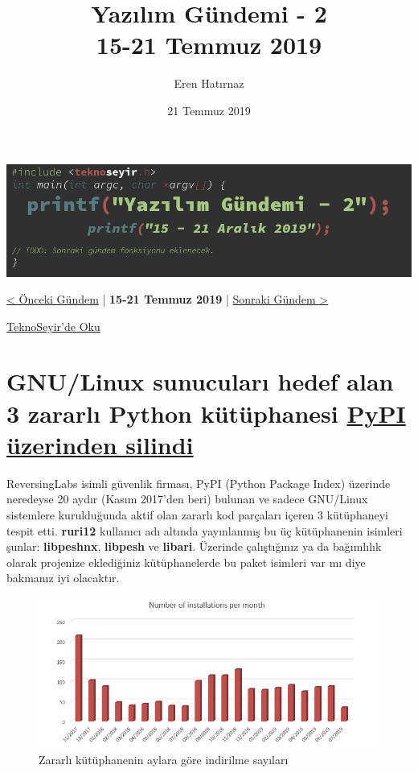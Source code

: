 \documentclass[11pt]{article}
\author{Eren Hatırnaz}
\date{21 Temmuz 2019}
\title{Yazılım Gündemi - 2\\\medskip
\large 15-21 Temmuz 2019}
\begin{document}
\maketitle
\tableofcontents \clearpage\shorthandoff{=}

\begin{center}
\includegraphics[width=.9\linewidth]{gorseller/yazilim-gundemi-banner.png}
\end{center}

\begin{center}
\href{../01/yazilim-gundemi-01.pdf}{< Önceki Gündem} | \textbf{15-21 Temmuz 2019} | \href{../03/yazilim-gundemi-03.pdf}{Sonraki Gündem >}

\href{https://teknoseyir.com/blog/yazilim-gundemi-2-15-21-temmuz-2019}{TeknoSeyir'de Oku}
\end{center}

\section{GNU/Linux sunucuları hedef alan 3 zararlı Python kütüphanesi \href{https://www.zdnet.com/article/malicious-python-libraries-targeting-linux-servers-removed-from-pypi/}{PyPI üzerinden silindi}}
\label{sec:org1ab69f7}
ReversingLabs isimli güvenlik firması, PyPI (Python Package Index) üzerinde
neredeyse 20 aydır (Kasım 2017'den beri) bulunan ve sadece GNU/Linux sistemlere
kurulduğunda aktif olan zararlı kod parçaları içeren 3 kütüphaneyi tespit etti.
\textbf{ruri12} kullanıcı adı altında yayınlanmış bu üç kütüphanenin isimleri şunlar:
\textbf{libpeshnx}, \textbf{libpesh} ve \textbf{libari}. Üzerinde çalıştığınız ya da bağımlılık
olarak projenize eklediğiniz kütüphanelerde bu paket isimleri var mı diye
bakmanız iyi olacaktır.

\begin{figure}[htbp]
\centering
\includegraphics[width=.9\linewidth]{gorseller/zararli-kutuphane-pypi.png}
\caption{Zararlı kütüphanenin aylara göre indirilme sayıları}
\end{figure}
\end{document}
